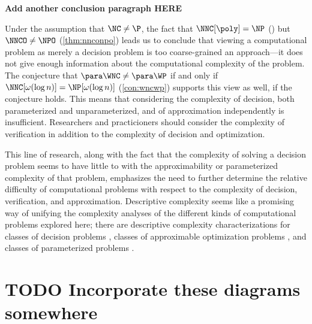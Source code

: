 %
%
%
\textbf{Add another conclusion paragraph HERE}

Under the assumption that $\NC \neq \P$, the fact that $\NNC[\poly] = \NP$ (\autocite{wolf94}) but $\NNCO \neq \NPO$ (\autoref{thm:nnconpo}) leads us to conclude that viewing a computational problem as merely a decision problem is too coarse-grained an approach---it does not give enough information about the computational complexity of the problem.
The conjecture that $\para \WNC \neq \para \WP$ if and only if $\NNC[\omega(\log n)] = \NP[\omega(\log n)]$ (\autoref{con:wncwp}) supports this view as well, if the conjecture holds.
This means that considering the complexity of decision, both parameterized and unparameterized, and of approximation independently is insufficient.
Researchers and practicioners should consider the complexity of verification in addition to the complexity of decision and optimization.

%
%
This line of research, along with the fact that the complexity of solving a decision problem seems to have little to with the approximability or parameterized complexity of that problem, emphasizes the need to further determine the relative difficulty of computational problems with respect to the complexity of decision, verification, and approximation.
Descriptive complexity seems like a promising way of unifying the complexity analyses of the different kinds of computational problems explored here; there are descriptive complexity characterizations for classes of decision problems \autocite{immerman99}, classes of approximable optimization problems \autocite{kt93}, and classes of parameterized problems \autocite{fg06}.

\section{TODO Incorporate these diagrams somewhere}


\begin{minipage}[t]{0.31\linewidth}
  \centering
  
\end{minipage}%
\begin{minipage}[t]{0.31\linewidth}
  \centering
  
\end{minipage}%
\begin{minipage}[t]{0.31\linewidth}
  \centering
  
\end{minipage}

